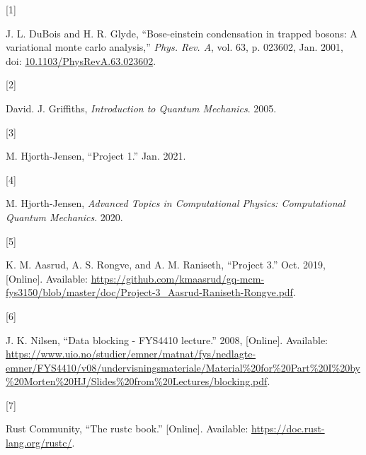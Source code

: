 \documentclass[
]{article}
\newlength{\cslhangindent}
\newlength{\csllabelwidth}
\newenvironment{CSLReferences}[2] %
 {%
  \setlength{\parindent}{0pt}
  \ifodd #1 \everypar{\setlength{\hangindent}{\cslhangindent}}\ignorespaces\fi
  \ifnum #2 > 0
  \setlength{\parskip}{#2\baselineskip}
  \fi
 }%
 {}
\newcommand{\CSLLeftMargin}[1]{\parbox[t]{\csllabelwidth}{#1}}
\newcommand{\CSLRightInline}[1]{\parbox[t]{\linewidth - \csllabelwidth}{#1}\break}
\begin{document}
\hypertarget{refs}{}
\begin{CSLReferences}{0}{0}
\leavevmode{}%
\CSLLeftMargin{{[}1{]} }
\CSLRightInline{J. L. DuBois and H. R. Glyde, {``Bose-einstein
condensation in trapped bosons: A variational monte carlo analysis,''}
\emph{Phys. Rev. A}, vol. 63, p. 023602, Jan. 2001, doi:
\href{https://doi.org/10.1103/PhysRevA.63.023602}{10.1103/PhysRevA.63.023602}.}

\leavevmode{}%
\CSLLeftMargin{{[}2{]} }
\CSLRightInline{David. J. Griffiths, \emph{Introduction to Quantum
Mechanics}. 2005.}

\leavevmode{}%
\CSLLeftMargin{{[}3{]} }
\CSLRightInline{M. Hjorth-Jensen, {``Project 1.''} Jan. 2021.}

\leavevmode{}%
\CSLLeftMargin{{[}4{]} }
\CSLRightInline{M. Hjorth-Jensen, \emph{{Advanced Topics in
Computational Physics: Computational Quantum Mechanics}}. 2020.}

\leavevmode{}%
\CSLLeftMargin{{[}5{]} }
\CSLRightInline{K. M. Aasrud, A. S. Rongve, and A. M. Raniseth,
{``Project 3.''} Oct. 2019, {[}Online{]}. Available:
\url{https://github.com/kmaasrud/gq-mcm-fys3150/blob/master/doc/Project-3_Aasrud-Raniseth-Rongve.pdf}.}

\leavevmode{}%
\CSLLeftMargin{{[}6{]} }
\CSLRightInline{J. K. Nilsen, {``Data blocking - FYS4410 lecture.''}
2008, {[}Online{]}. Available:
\url{https://www.uio.no/studier/emner/matnat/fys/nedlagte-emner/FYS4410/v08/undervisningsmateriale/Material\%20for\%20Part\%20I\%20by\%20Morten\%20HJ/Slides\%20from\%20Lectures/blocking.pdf}.}

\leavevmode{}%
\CSLLeftMargin{{[}7{]} }
\CSLRightInline{Rust Community, {``The rustc book.''} {[}Online{]}.
Available: \url{https://doc.rust-lang.org/rustc/}.}

\end{CSLReferences}
\end{document}
